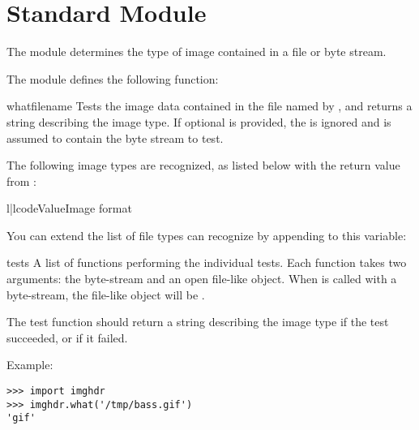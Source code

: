 \section{Standard Module }
\label{module-imghdr}

The  module determines the type of image contained in a
file or byte stream.

The  module defines the following function:


\begin{funcdesc}{what}{filename}
Tests the image data contained in the file named by ,
and returns a string describing the image type.  If optional 
is provided, the  is ignored and  is assumed to
contain the byte stream to test.
\end{funcdesc}

The following image types are recognized, as listed below with the
return value from :

\begin{tableii}{l|l}{code}{Value}{Image format}
\end{tableii}

You can extend the list of file types  can recognize by
appending to this variable:

\begin{datadesc}{tests}
A list of functions performing the individual tests.  Each function
takes two arguments: the byte-stream and an open file-like object.
When  is called with a byte-stream, the file-like
object will be .

The test function should return a string describing the image type if
the test succeeded, or  if it failed.
\end{datadesc}

Example:

\begin{verbatim}
>>> import imghdr
>>> imghdr.what('/tmp/bass.gif')
'gif'
\end{verbatim}

